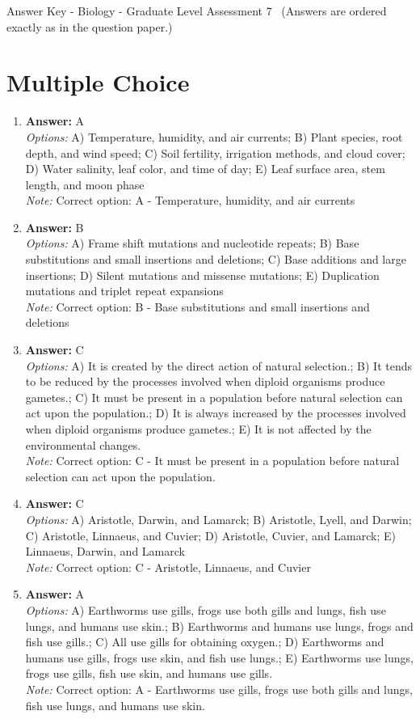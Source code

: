 \documentclass[12pt]{article}
\begin{document}
\begin{center}
Answer Key - Biology - Graduate Level Assessment 7 \
\small (Answers are ordered exactly as in the question paper.)
\end{center}

\section*{Multiple Choice}
\begin{enumerate}[label=\arabic*.]
\item \textbf{Answer:} A
\\ \textit{Options:} A) Temperature, humidity, and air currents; B) Plant species, root depth, and wind speed; C) Soil fertility, irrigation methods, and cloud cover; D) Water salinity, leaf color, and time of day; E) Leaf surface area, stem length, and moon phase
\\ \textit{Note:} Correct option: A - Temperature, humidity, and air currents
\item \textbf{Answer:} B
\\ \textit{Options:} A) Frame shift mutations and nucleotide repeats; B) Base substitutions and small insertions and deletions; C) Base additions and large insertions; D) Silent mutations and missense mutations; E) Duplication mutations and triplet repeat expansions
\\ \textit{Note:} Correct option: B - Base substitutions and small insertions and deletions
\item \textbf{Answer:} C
\\ \textit{Options:} A) It is created by the direct action of natural selection.; B) It tends to be reduced by the processes involved when diploid organisms produce gametes.; C) It must be present in a population before natural selection can act upon the population.; D) It is always increased by the processes involved when diploid organisms produce gametes.; E) It is not affected by the environmental changes.
\\ \textit{Note:} Correct option: C - It must be present in a population before natural selection can act upon the population.
\item \textbf{Answer:} C
\\ \textit{Options:} A) Aristotle, Darwin, and Lamarck; B) Aristotle, Lyell, and Darwin; C) Aristotle, Linnaeus, and Cuvier; D) Aristotle, Cuvier, and Lamarck; E) Linnaeus, Darwin, and Lamarck
\\ \textit{Note:} Correct option: C - Aristotle, Linnaeus, and Cuvier
\item \textbf{Answer:} A
\\ \textit{Options:} A) Earthworms use gills, frogs use both gills and lungs, fish use lungs, and humans use skin.; B) Earthworms and humans use lungs, frogs and fish use gills.; C) All use gills for obtaining oxygen.; D) Earthworms and humans use gills, frogs use skin, and fish use lungs.; E) Earthworms use lungs, frogs use gills, fish use skin, and humans use gills.
\\ \textit{Note:} Correct option: A - Earthworms use gills, frogs use both gills and lungs, fish use lungs, and humans use skin.
\end{enumerate}
\end{document}
